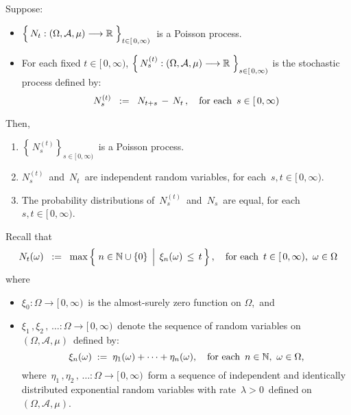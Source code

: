 \vskip 0.5cm
\begin{theorem}
\mbox{}
\vskip 0.15cm
\noindent
Suppose:
\begin{itemize}
\item
	$\left\{\,N_{t} : (\Omega,\mathcal{A},\mu) \overset{{\color{white}-}}{\longrightarrow} \Re \;\right\}_{t \in [\,0,\infty)}$\,
	is a Poisson process.
\item
	For each fixed $t \in [\,0,\infty)$,
	$\left\{\,N^{(t)}_{s} : (\Omega,\mathcal{A},\mu) \overset{{\color{white}-}}{\longrightarrow} \Re \;\right\}_{s \in [\,0,\infty)}$\;
	is the stochastic process defined by:
	\begin{equation*}
	N^{(t)}_{s} \;\; := \;\; N_{t+s} \,-\, N_{t}\,,
	\quad
	\textnormal{for each \,$s \in [\,0,\infty)$}
	\end{equation*}
\end{itemize}
Then,
\begin{enumerate}
\item
	$\left\{\,N^{(t)}_{s}\right\}_{s \in [\,0,\infty)}$\, is a Poisson process.
\item
	$N^{(t)}_{s}$\, and \,$N_{t}$\, are independent random variables, for each \,$s, t \in [\,0,\infty)$.
\item
	The probability distributions of \,$N^{(t)}_{s}$\, and \,$N_{s}$\, are equal, for each \,$s, t \in [\,0,\infty)$.
\end{enumerate}
\end{theorem}
\proof
Recall that
\begin{equation*}
N_{t}(\omega)
\;\; := \;\;
	\max\left\{\,\left.
		n \overset{{\color{white}.}}{\in} \N\cup\{0\}
		\,\;\right\vert\;
		\xi_{n}(\omega) \,\leq\, t
		\,\right\},
\quad
\textnormal{for each \,$t \in [\,0,\infty)$,\, $\omega \in \Omega$}
\end{equation*}
where
\begin{itemize}
\item
	$\xi_{0} : \Omega \longrightarrow [\,0,\infty)$\, is the almost-surely zero function on $\Omega$,\,
and
\item
	$\xi_{1}\,, \xi_{2}\,, \,\ldots : \Omega \longrightarrow [\,0,\infty)$\,
	denote the sequence of random variables on
	\,$(\Omega,\mathcal{A},\mu)$\, defined by:
	\begin{equation*}
	\xi_{n}(\omega) \; := \; \eta_{1}(\omega) + \cdots + \eta_{n}(\omega),
	\quad
	\textnormal{for each \,$n \in \mathbb{N}$,\, $\omega \in \Omega$},
	\end{equation*}
	where
	\,$\eta_{1}\,, \eta_{2}\,, \,\ldots : \Omega \longrightarrow [\,0,\infty)$\,
	form a sequence of independent and identically distributed
	exponential random variables with rate \,$\lambda > 0$\,
	defined on \,$(\Omega,\mathcal{A},\mu)$.
\end{itemize}
